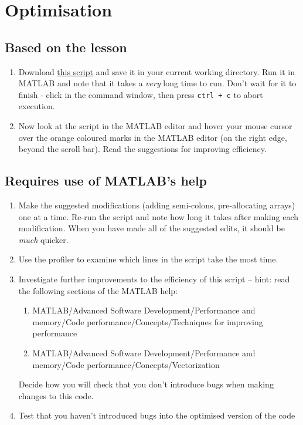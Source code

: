 \documentclass{article}
\begin{document}
	\section{Optimisation}
		\subsection*{Based on the lesson}
			\begin{enumerate}
				\item Download \href{https://github.com/UoMResearchIT/MATLAB-online-exercises/raw/master/lesson6_mfiles/loopy.m}{this script} and save it in your current working directory. Run it in MATLAB and note that it takes a \textit{very} long time to run. Don't wait for it to finish - click in the command window, then press \texttt{ctrl + c} to abort execution.
				
				\item Now look at the script in the MATLAB editor and hover your mouse cursor over the orange coloured marks in the MATLAB editor (on the right edge, beyond the scroll bar). Read the suggestions for improving efficiency.
			\end{enumerate}	
		
		\subsection*{Requires use of MATLAB's help}
		\begin{enumerate}[resume]
			\item Make the suggested modifications (adding semi-colons, pre-allocating arrays) one at a time. Re-run the script and note how long it takes after making each modification. When you have made all of the suggested edits, it should be \textit{much} quicker.
			\item Use the profiler to examine which lines in the script take the most time. 
			\item Investigate further improvements to the efficiency of this script -- hint: read the following sections of the MATLAB help:
			\begin{enumerate}
				\item MATLAB/Advanced Software Development/Performance and memory/Code performance/Concepts/Techniques for improving performance
				\item MATLAB/Advanced Software Development/Performance and memory/Code performance/Concepts/Vectorization
			\end{enumerate}
			Decide how you will check that you don't introduce bugs when making changes to this code.
			\item Test that you haven't introduced bugs into the optimised version of the code
		\end{enumerate}
\end{document}
